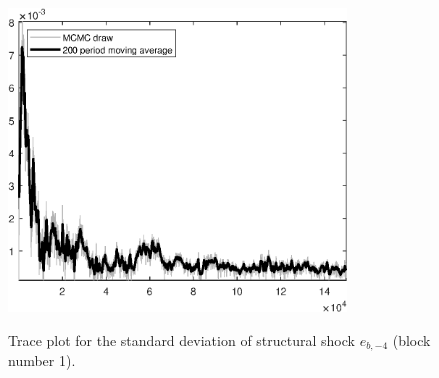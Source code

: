 \begin{figure}[H]
\centering
  \includegraphics[width=0.8\textwidth]{BRS_sectoral_KK/graphs/TracePlot_SE_e_b_news_blck_1}\\
    \caption{Trace plot for the standard deviation of structural shock ${e_{b,-4}}$ (block number 1).}
\end{figure}
